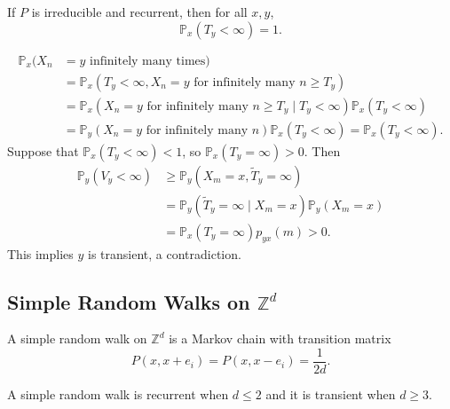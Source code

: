 \documentclass[12pt]{article}
\begin{document}
\begin{theorem}
	If $P$ is irreducible and recurrent, then for all $x, y$,
	\[
		\mathbb{P}_x(T_y < \infty) = 1
	.\]
\end{theorem}

\begin{proofbox}
\begin{align*}
	\mathbb{P}_x(X_n &= y \text{ infinitely many times}) \\
			 &= \mathbb{P}_x(T_y < \infty, X_n = y \text{ for infinitely many } n \geq T_y) \\
							    &= \mathbb{P}_x(X_n = y \text{ for infinitely many } n \geq T_y \mid T_y < \infty) \mathbb{P}_x(T_y < \infty) \\
							    &= \mathbb{P}_y(X_n = y \text{ for infinitely many } n) \mathbb{P}_x(T_y < \infty) = \mathbb{P}_x(T_y < \infty).
\end{align*}
Suppose that $\mathbb{P}_x(T_y < \infty) < 1$, so $\mathbb{P}_x(T_y = \infty) > 0$. Then
\begin{align*}
	\mathbb{P}_y(V_y < \infty) &\geq \mathbb{P}_y(X_m = x, \tilde T_y = \infty) \\
				   &=\mathbb{P}_y(\tilde T_y = \infty \mid X_m = x) \mathbb{P}_y(X_m = x) \\
				   &= \mathbb{P}_x(T_y = \infty) p_{yx}(m) > 0.
\end{align*}
This implies $y$ is transient, a contradiction.
\end{proofbox}

\subsection{Simple Random Walks on \texorpdfstring{$\mathbb{Z}^{d}$}{Z\^d}}%
\label{sub:simple_random_walks_on_zd}

\begin{definition}
	A simple random walk on $\mathbb{Z}^{d}$ is a Markov chain with transition matrix
	\[
		P(x, x+e_i) = P(x, x-e_i) = \frac{1}{2d}
	.\]
\end{definition}

\begin{theorem}[P\'{o}lya]
	A simple random walk is recurrent when $d \leq 2$ and it is transient when $d \geq 3$.
\end{theorem}
\end{document}
